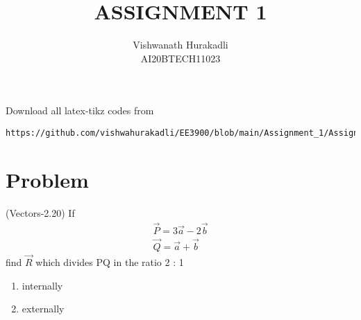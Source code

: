 \documentclass[journal,12pt,twocolumn]{IEEEtran}
\begin{document}
     \def\topbox#1{\raisebox{-\baselineskip}[0in][0in]{#1}}
     \def\midbox#1{\raisebox{-0.5\baselineskip}[0in][0in]{#1}}
\vspace{3cm}
\title{ASSIGNMENT 1}
\author{Vishwanath Hurakadli\\ AI20BTECH11023}
\maketitle
\newpage
\bigskip
\renewcommand{\thefigure}{\theenumi}
\renewcommand{\thetable}{\theenumi}
Download all latex-tikz codes from 
\begin{lstlisting}
https://github.com/vishwahurakadli/EE3900/blob/main/Assignment_1/Assignment_1.tex
\end{lstlisting}
%
\section{Problem}
(Vectors-2.20) If
\begin{align}
\vec{P} = 3\vec{a} - 2\vec{b}\\
\vec{Q} = \vec{a} +\vec{b}
\end{align}
 find $\vec{R}$ which divides PQ in the ratio 2 : 1
\begin{enumerate}
    \item internally \label{option A}
    \item externally \label{option B}
\end{enumerate}
\end{document}
